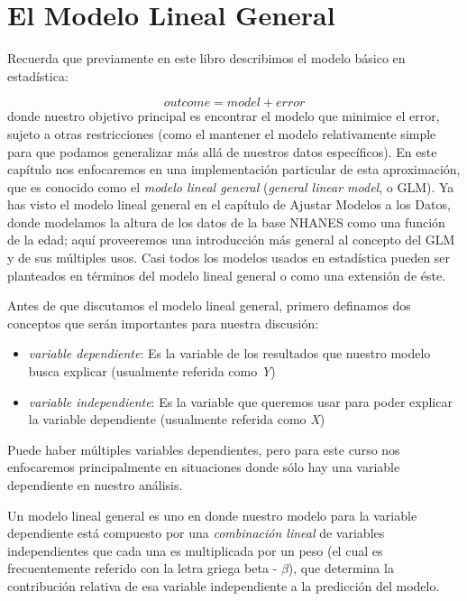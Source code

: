 \documentclass[
  12pt,
]{book}
\providecommand{\tightlist}{%
  \setlength{\itemsep}{0pt}\setlength{\parskip}{0pt}}
\begin{document}
\hypertarget{el-modelo-lineal-general}{%
\chapter{El Modelo Lineal General}\label{el-modelo-lineal-general}}

Recuerda que previamente en este libro describimos el modelo básico en estadística:

\[
outcome = model + error
\]
donde nuestro objetivo principal es encontrar el modelo que minimice el error, sujeto a otras restricciones (como el mantener el modelo relativamente simple para que podamos generalizar más allá de nuestros datos específicos). En este capítulo nos enfocaremos en una implementación particular de esta aproximación, que es conocido como el \emph{modelo lineal general} (\emph{general linear model}, o GLM). Ya has visto el modelo lineal general en el capítulo de Ajustar Modelos a los Datos, donde modelamos la altura de los datos de la base NHANES como una función de la edad; aquí proveeremos una introducción más general al concepto del GLM y de sus múltiples usos. Casi todos los modelos usados en estadística pueden ser planteados en términos del modelo lineal general o como una extensión de éste.

Antes de que discutamos el modelo lineal general, primero definamos dos conceptos que serán importantes para nuestra discusión:

\begin{itemize}
\tightlist
\item
  \emph{variable dependiente}: Es la variable de los resultados que nuestro modelo busca explicar (usualmente referida como \emph{Y})
\item
  \emph{variable independiente}: Es la variable que queremos usar para poder explicar la variable dependiente (usualmente referida como \emph{X})
\end{itemize}

Puede haber múltiples variables dependientes, pero para este curso nos enfocaremos principalmente en situaciones donde sólo hay una variable dependiente en nuestro análisis.

Un modelo lineal general es uno en donde nuestro modelo para la variable dependiente está compuesto por una \emph{combinación lineal} de variables independientes que cada una es multiplicada por un peso (el cual es frecuentemente referido con la letra griega beta - \(\beta\)), que determina la contribución relativa de esa variable independiente a la predicción del modelo.
\end{document}
